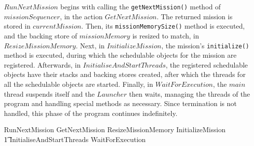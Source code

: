 $RunNextMission$ begins with calling the \texttt{getNextMission()}
method of $missionSequencer$, in the action $GetNextMission$.
The returned mission is stored in $currentMission$.
Then, its \texttt{missionMemorySize()} method is executed, and the
backing store of $missionMemory$ is resized to match, in
$ResizeMissionMemory$.
Next, in $InitializeMission$, the mission's \texttt{initialize()}
method is executed, during which the schedulable objects for the
mission are registered.
Afterwards, in $InitialiseAndStartThreads$, the registered schedulable
objects have their stacks and backing stores created, after which the
threads for all the schedulable objects are started.
Finally, in $WaitForExecution$, the $main$ thread suspends itself and
the $Launcher$ then waits, managing the threads of the program and
handling special methods as necessary.
Since termination is not handled, this phase of the program continues
indefinitely.
\begin{circusaction}
  RunNextMission \circdef GetNextMission \circseq ResizeMissionMemory \circseq InitializeMission \circseq \\
  \t1 InitialiseAndStartThreads \circseq WaitForExecution
\end{circusaction}

